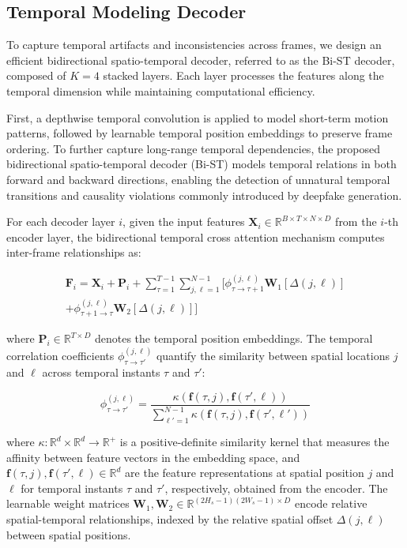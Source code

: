 \subsection{Temporal Modeling Decoder}

To capture temporal artifacts and inconsistencies across frames, we design an efficient bidirectional spatio-temporal decoder, referred to as the Bi-ST decoder, composed of $K=4$ stacked layers. Each layer processes the features along the temporal dimension while maintaining computational efficiency.

First, a depthwise temporal convolution is applied to model short-term motion patterns, followed by learnable temporal position embeddings to preserve frame ordering. To further capture long-range temporal dependencies, the proposed bidirectional spatio-temporal decoder (Bi-ST) models temporal relations in both forward and backward directions, enabling the detection of unnatural temporal transitions and causality violations commonly introduced by deepfake generation.

For each decoder layer $i$, given the input features $\mathbf{X}_i \in \mathbb{R}^{B \times T \times N \times D}$ from the $i$-th encoder layer, the bidirectional temporal cross attention mechanism computes inter-frame relationships as:

\begin{equation}
\begin{split}
\mathbf{F}_i = \mathbf{X}_i + \mathbf{P}_i + \sum_{\tau=1}^{T-1} \sum_{j,\ell=1}^{N-1} \Big[ \phi^{(j,\ell)}_{\tau \rightarrow \tau+1} \mathbf{W}_1[\Delta(j,\ell)] \\
+ \phi^{(j,\ell)}_{\tau+1 \rightarrow \tau} \mathbf{W}_2[\Delta(j,\ell)] \Big]
\end{split}
\end{equation}

where $\mathbf{P}_i \in \mathbb{R}^{T \times D}$ denotes the temporal position embeddings. The temporal correlation coefficients $\phi_{\tau \rightarrow \tau'}^{(j,\ell)}$ quantify the similarity between spatial locations $j$ and $\ell$ across temporal instants $\tau$ and $\tau'$:

\begin{equation}
\phi_{\tau \rightarrow \tau'}^{(j,\ell)} = \frac{\kappa(\mathbf{f}(\tau, j), \mathbf{f}(\tau', \ell))}{\sum_{\ell'=1}^{N-1} \kappa(\mathbf{f}(\tau, j), \mathbf{f}(\tau', \ell'))}
\end{equation}

where $\kappa: \mathbb{R}^d \times \mathbb{R}^d \rightarrow \mathbb{R}^+$ is a positive-definite similarity kernel that measures the affinity between feature vectors in the embedding space, and $\mathbf{f}(\tau, j), \mathbf{f}(\tau', \ell) \in \mathbb{R}^d$ are the feature representations at spatial position $j$ and $\ell$ for temporal instants $\tau$ and $\tau'$, respectively, obtained from the encoder. The learnable weight matrices $\mathbf{W}_1, \mathbf{W}_2 \in \mathbb{R}^{(2H_s-1)(2W_s-1) \times D}$ encode relative spatial-temporal relationships, indexed by the relative spatial offset $\Delta(j,\ell)$ between spatial positions.

